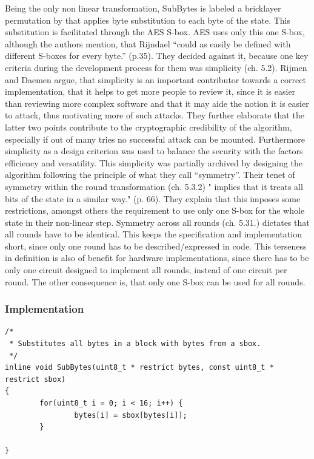 Being the only non linear transformation, SubBytes is labeled a
bricklayer permutation by \cite[p. 34]{rijndael} that applies byte substitution to
each byte of the state. This substitution is facilitated through the
AES S-box. AES uses
only this one S-box, although the authors mention, that Rijndael ``could
as easily be defined with different S-boxes for every byte.'' (p.35).
They decided against it, because one key criteria during the
development process for them was simplicity (ch. 5.2). Rijmen and
Daemen argue, that simplicity is an important contributor towards a
correct implementation, that it helps to get more people to review it,
since it is easier than reviewing more complex software and that it may
aide the notion it is easier to attack, thus motivating more of such
attacks. They further elaborate that the latter two points contribute to
the cryptographic credibility of the algorithm, especially if out of
many tries no successful attack can be mounted. Furthermore simplicity as
a design criterion was used to balance the security with the factors
efficiency and versatility. This simplicity was partially archived by
designing the algorithm following the principle of what they call
``symmetry''. Their tenet of symmetry within the round transformation
(ch. 5.3.2) " implies that it treats all bits of the state in a similar
way." (p. 66). They explain that this imposes some restrictions, amongst
others the requirement to use only one S-box for the whole state in their
non-linear step. Symmetry across all rounds (ch. 5.31.) dictates that
all rounds have to be identical. This keeps the specification and
implementation short, since only one round has to be described/expressed
in code. This terseness in definition is also of benefit for hardware
implementations, since there has to be only one circuit designed to
implement all rounds, instead of one circuit per round. The other consequence is,
that only one S-box can be used for all rounds.

\hypertarget{implementation-4}{%
\subsubsection{Implementation}\label{implementation-4}}

\begin{lstlisting}
/*
 * Substitutes all bytes in a block with bytes from a sbox.
 */
inline void SubBytes(uint8_t * restrict bytes, const uint8_t * restrict sbox)
{
        for(uint8_t i = 0; i < 16; i++) {
                bytes[i] = sbox[bytes[i]];
        }
    
}
\end{lstlisting}

